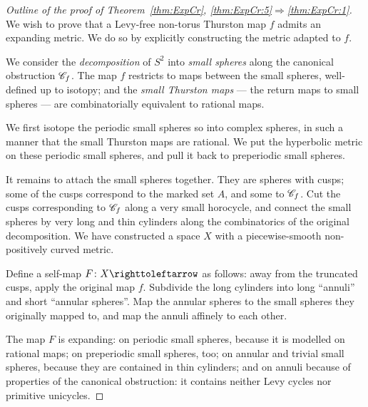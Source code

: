\documentclass{amsart}
\begin{document}
\begin{proof}[Outline of the proof of Theorem~\ref{thm:ExpCr}, \eqref{thm:ExpCr:5}$\Rightarrow$\eqref{thm:ExpCr:1}]
  We wish to prove that a Levy-free non-torus Thurston map $f$ admits
  an expanding metric. We do so by explicitly constructing the metric
  adapted to $f$.

  We consider the \emph{decomposition} of $S^2$ into \emph{small
    spheres} along the canonical obstruction ${\mathscr C}_f$. The map $f$
  restricts to maps between the small spheres, well-defined up to
  isotopy; and the \emph{small Thurston maps} --- the return maps to
  small spheres --- are combinatorially equivalent to rational maps.

  We first isotope the periodic small spheres so into complex spheres,
  in such a manner that the small Thurston maps are rational. We put
  the hyperbolic metric on these periodic small spheres, and pull it
  back to preperiodic small spheres.

  It remains to attach the small spheres together. They are spheres
  with cusps; some of the cusps correspond to the marked set $A$, and
  some to ${\mathscr C}_f$. Cut the cusps corresponding to ${\mathscr C}_f$ along a very
  small horocycle, and connect the small spheres by very long and thin
  cylinders along the combinatorics of the original decomposition. We
  have constructed a space $X$ with a piecewise-smooth non-positively
  curved metric.

  Define a self-map $F\colon X\selfmap$ as follows: away from the
  truncated cusps, apply the original map $f$. Subdivide the long
  cylinders into long ``annuli'' and short ``annular spheres''. Map
  the annular spheres to the small spheres they originally mapped to,
  and map the annuli affinely to each other.

  The map $F$ is expanding: on periodic small spheres, because it is
  modelled on rational maps; on preperiodic small spheres, too; on
  annular and trivial small spheres, because they are contained in
  thin cylinders; and on annuli because of properties of the canonical
  obstruction: it contains neither Levy cycles nor primitive unicycles.
\end{proof}
\end{document}
